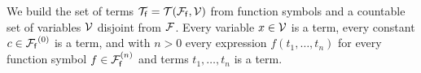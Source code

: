 
\begin{definition}\label{def:terms}
	We build the set of {\myem terms }${\mathcal T}_{\mathsf f} = {{\mathcal T}({\mathcal F}_{\mathsf f},{\mathcal V})}$ 
	from function symbols and a
	countable set of {\myem variables }${\mathcal V}$ disjoint from ${\mathcal F}$\!.
	Every variable $x\in{\mathcal V}$ is a term,
	every constant $c\in{{\mathcal F}_{\mathsf f}}^{(0)}$ is a term, 
	and with $n>0$ every expression $f(t_1,\ldots,t_n)$
	for every function symbol $f\in{{\mathcal F}_{\mathsf f}^{(n)}}$ 
	and terms $t_1,\ldots,t_n$
	is a term.
	
	
\end{definition}

